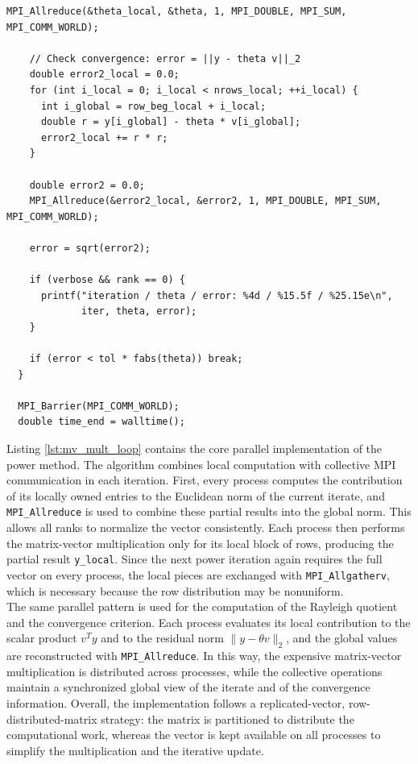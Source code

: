 \documentclass[unicode,10pt,a4paper,oneside,numbers=endperiod,openany]{scrartcl}
\begin{document}
\begin{lstlisting}[style=grayverbatim, caption={Power method loop for parallel matrix-vector multiplication}, label={lst:mv_mult_loop}]
    MPI_Allreduce(&theta_local, &theta, 1, MPI_DOUBLE, MPI_SUM, MPI_COMM_WORLD);

    // Check convergence: error = ||y - theta v||_2
    double error2_local = 0.0;
    for (int i_local = 0; i_local < nrows_local; ++i_local) {
      int i_global = row_beg_local + i_local;
      double r = y[i_global] - theta * v[i_global];
      error2_local += r * r;
    }

    double error2 = 0.0;
    MPI_Allreduce(&error2_local, &error2, 1, MPI_DOUBLE, MPI_SUM, MPI_COMM_WORLD);

    error = sqrt(error2);

    if (verbose && rank == 0) {
      printf("iteration / theta / error: %4d / %15.5f / %25.15e\n",
             iter, theta, error);
    }

    if (error < tol * fabs(theta)) break;
  }

  MPI_Barrier(MPI_COMM_WORLD);
  double time_end = walltime();
\end{lstlisting}

Listing \ref{lst:mv_mult_loop} contains the core parallel implementation of the power method. The algorithm combines local computation with collective MPI communication in each iteration. First, every process computes the contribution of its locally owned entries to the Euclidean norm of the current iterate, and \texttt{MPI\_Allreduce} is used to combine these partial results into the global norm. This allows all ranks to normalize the vector consistently. Each process then performs the matrix-vector multiplication only for its local block of rows, producing the partial result \texttt{y\_local}. Since the next power iteration again requires the full vector on every process, the local pieces are exchanged with \texttt{MPI\_Allgatherv}, which is necessary because the row distribution may be nonuniform.\\

The same parallel pattern is used for the computation of the Rayleigh quotient and the convergence criterion. Each process evaluates its local contribution to the scalar product $v^T y$ and to the residual norm $\lVert y - \theta v \rVert_2$, and the global values are reconstructed with \texttt{MPI\_Allreduce}. In this way, the expensive matrix-vector multiplication is distributed across processes, while the collective operations maintain a synchronized global view of the iterate and of the convergence information. Overall, the implementation follows a replicated-vector, row-distributed-matrix strategy: the matrix is partitioned to distribute the computational work, whereas the vector is kept available on all processes to simplify the multiplication and the iterative update.
\end{document}

